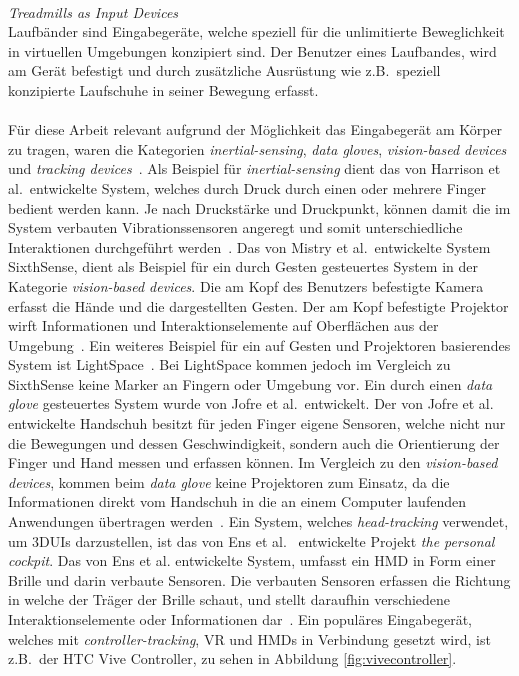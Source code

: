 \\
\noindent \textit{Treadmills as Input Devices}\\
Laufbänder sind Eingabegeräte, welche speziell für die unlimitierte Beweglichkeit in virtuellen Umgebungen konzipiert sind. Der Benutzer eines Laufbandes, wird am Gerät befestigt und durch zusätzliche Ausrüstung wie z.B.~speziell konzipierte Laufschuhe in seiner Bewegung erfasst.
\\
\\
Für diese Arbeit relevant aufgrund der Möglichkeit das Eingabegerät am Körper zu tragen, waren die Kategorien \textit{inertial-sensing}, \textit{data gloves}, \textit{vision-based devices} und \textit{tracking devices}~\cite{modernworldinputdevices}. Als Beispiel für \textit{inertial-sensing} dient das von Harrison et al.~entwickelte System, welches durch Druck durch einen oder mehrere Finger bedient werden kann. Je nach Druckstärke und Druckpunkt, können damit die im System verbauten Vibrationssensoren angeregt und somit unterschiedliche Interaktionen durchgeführt werden~\cite{skinput}. Das von Mistry et al.~entwickelte System SixthSense, dient als Beispiel für ein durch Gesten gesteuertes System in der Kategorie \textit{vision-based devices}. Die am Kopf des Benutzers befestigte Kamera erfasst die Hände und die dargestellten Gesten. Der am Kopf befestigte Projektor wirft Informationen und Interaktionselemente auf Oberflächen aus der Umgebung~\cite{sixthsense}. Ein weiteres Beispiel für ein auf Gesten und Projektoren basierendes System ist LightSpace~\cite{lightspace}. Bei LightSpace kommen jedoch im Vergleich zu SixthSense keine Marker an Fingern oder Umgebung vor. Ein durch einen \textit{data glove} gesteuertes System wurde von Jofre et al.~entwickelt. Der von Jofre et al.~ entwickelte Handschuh besitzt für jeden Finger eigene Sensoren, welche nicht nur die Bewegungen und dessen Geschwindigkeit, sondern auch die Orientierung der Finger und Hand messen und erfassen können. Im Vergleich zu den \textit{vision-based devices}, kommen beim \textit{data glove} keine Projektoren zum Einsatz, da die Informationen direkt vom Handschuh in die an einem Computer laufenden Anwendungen übertragen werden~\cite{dataglove}. Ein System, welches \textit{head-tracking} verwendet, um 3DUIs darzustellen, ist das von Ens et al.~ entwickelte Projekt \textit{the personal cockpit}. Das von Ens et al. entwickelte System, umfasst ein HMD in Form einer Brille und darin verbaute Sensoren. Die verbauten Sensoren erfassen die Richtung in welche der Träger der Brille schaut, und stellt daraufhin verschiedene Interaktionselemente oder Informationen dar~\cite{thepersonalcockpit}. Ein populäres Eingabegerät, welches mit \textit{controller-tracking}, VR und HMDs in Verbindung gesetzt wird, ist z.B.~der HTC Vive Controller, zu sehen in Abbildung \ref{fig:vivecontroller}.


